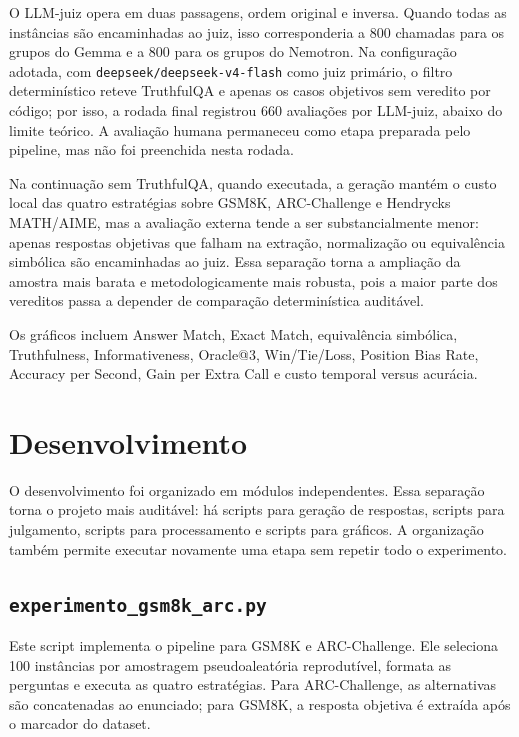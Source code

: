 \documentclass[12pt]{article}
\begin{document}
O LLM-juiz opera em duas passagens, ordem original e inversa. Quando todas as instâncias são encaminhadas ao juiz, isso corresponderia a 800 chamadas para os grupos do Gemma e a 800 para os grupos do Nemotron. Na configuração adotada, com \texttt{deepseek/deepseek-v4-flash} como juiz primário, o filtro determinístico reteve TruthfulQA e apenas os casos objetivos sem veredito por código; por isso, a rodada final registrou 660 avaliações por LLM-juiz, abaixo do limite teórico. A avaliação humana permaneceu como etapa preparada pelo pipeline, mas não foi preenchida nesta rodada.

Na continuação sem TruthfulQA, quando executada, a geração mantém o custo local das quatro estratégias sobre GSM8K, ARC-Challenge e Hendrycks MATH/AIME, mas a avaliação externa tende a ser substancialmente menor: apenas respostas objetivas que falham na extração, normalização ou equivalência simbólica são encaminhadas ao juiz. Essa separação torna a ampliação da amostra mais barata e metodologicamente mais robusta, pois a maior parte dos vereditos passa a depender de comparação determinística auditável.

Os gráficos incluem Answer Match, Exact Match, equivalência simbólica, Truthfulness, Informativeness, Oracle@3, Win/Tie/Loss, Position Bias Rate, Accuracy per Second, Gain per Extra Call e custo temporal versus acurácia.

\section{Desenvolvimento}

O desenvolvimento foi organizado em módulos independentes. Essa separação torna o projeto mais auditável: há scripts para geração de respostas, scripts para julgamento, scripts para processamento e scripts para gráficos. A organização também permite executar novamente uma etapa sem repetir todo o experimento.

\subsection{\texttt{experimento\_gsm8k\_arc.py}}

Este script implementa o pipeline para GSM8K e ARC-Challenge. Ele seleciona 100 instâncias por amostragem pseudoaleatória reprodutível, formata as perguntas e executa as quatro estratégias. Para ARC-Challenge, as alternativas são concatenadas ao enunciado; para GSM8K, a resposta objetiva é extraída após o marcador do dataset.
\end{document}

